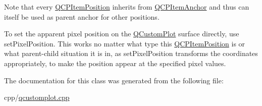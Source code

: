 Note that every \mbox{\hyperlink{class_q_c_p_item_position}{Q\+C\+P\+Item\+Position}} inherits from \mbox{\hyperlink{class_q_c_p_item_anchor}{Q\+C\+P\+Item\+Anchor}} and thus can itself be used as parent anchor for other positions.

To set the apparent pixel position on the \mbox{\hyperlink{class_q_custom_plot}{Q\+Custom\+Plot}} surface directly, use set\+Pixel\+Position. This works no matter what type this \mbox{\hyperlink{class_q_c_p_item_position}{Q\+C\+P\+Item\+Position}} is or what parent-\/child situation it is in, as set\+Pixel\+Position transforms the coordinates appropriately, to make the position appear at the specified pixel values. 

The documentation for this class was generated from the following file\+:\begin{DoxyCompactItemize}
\item 
cpp/\mbox{\hyperlink{qcustomplot_8cpp}{qcustomplot.\+cpp}}\end{DoxyCompactItemize}
